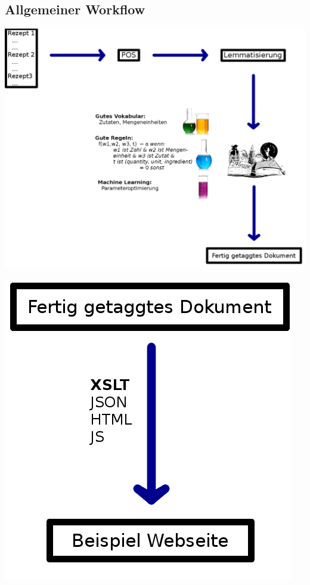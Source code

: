 \documentclass[12pt]{beamer}
\begin{document}
\subsection{Allgemeiner Workflow}
\begin{frame}
	\includegraphics[scale=0.8]{Images/workflow}
\end{frame}

\begin{frame}
	\begin{center}
		\includegraphics[scale=0.8]{Images/webseite}
	\end{center}
\end{frame}
\end{document}
